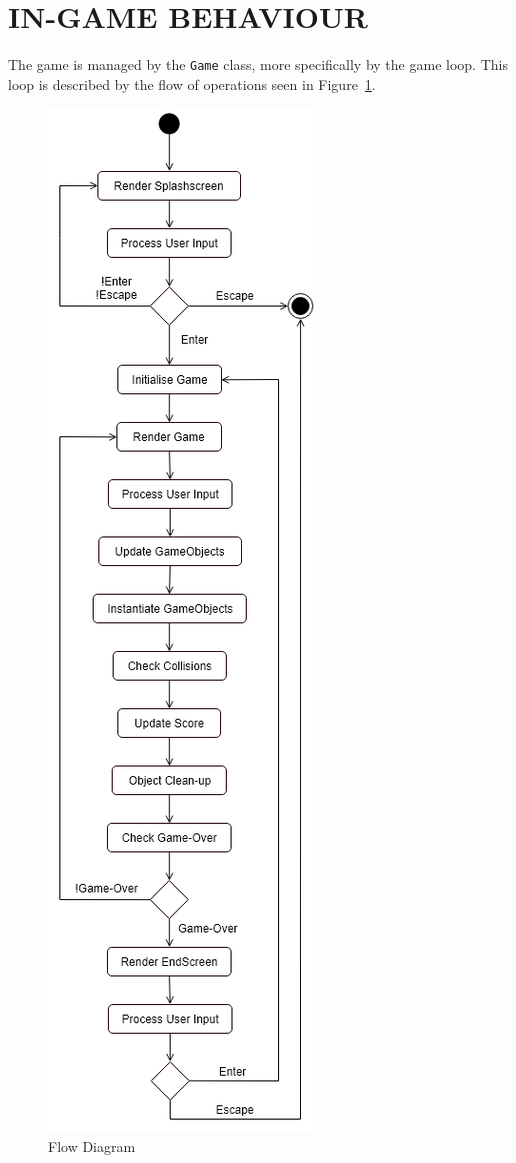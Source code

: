 \documentclass[10pt,twocolumn]{witseiepaper}
\begin{document}
\section{IN-GAME BEHAVIOUR}

The game is managed by the \texttt{Game} class, more specifically by the game loop. This loop is described by the flow of operations seen in Figure~\ref{fig:flowDiagram}. 

\begin{figure}[h]
	\centering
	\includegraphics[width=\textwidth,height=0.9\textheight,keepaspectratio]{flowdiagram.png}
	\caption{Flow Diagram}
	\raggedright
	\label{fig:flowDiagram}
\end{figure}
\end{document}
